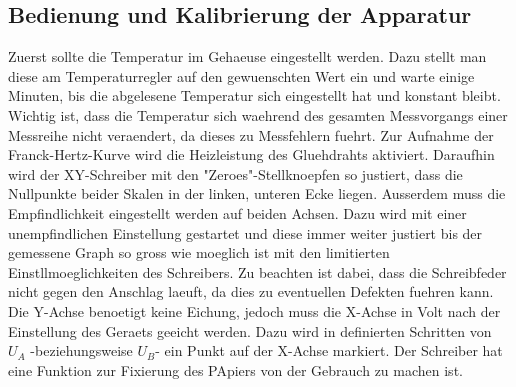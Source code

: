 \subsection{Bedienung und Kalibrierung der Apparatur}
Zuerst sollte die Temperatur im Gehaeuse eingestellt werden. Dazu stellt man diese am Temperaturregler auf den gewuenschten Wert ein und warte einige Minuten, bis die abgelesene Temperatur sich eingestellt hat und konstant bleibt. Wichtig ist, dass die Temperatur sich waehrend des gesamten Messvorgangs einer Messreihe nicht veraendert, da dieses zu Messfehlern fuehrt. Zur Aufnahme der Franck-Hertz-Kurve wird die Heizleistung des Gluehdrahts aktiviert. Daraufhin wird der XY-Schreiber mit den "Zeroes"-Stellknoepfen so justiert, dass die Nullpunkte beider Skalen in der linken, unteren Ecke liegen. Ausserdem muss die Empfindlichkeit eingestellt werden auf beiden Achsen. Dazu wird mit einer unempfindlichen Einstellung gestartet und diese immer weiter justiert bis der gemessene Graph so gross wie moeglich ist mit den limitierten Einstllmoeglichkeiten des Schreibers. Zu beachten ist dabei, dass die Schreibfeder nicht gegen den Anschlag laeuft, da dies zu eventuellen Defekten fuehren kann. Die Y-Achse benoetigt keine Eichung, jedoch muss die X-Achse in Volt nach der Einstellung des Geraets geeicht werden. Dazu wird in definierten Schritten von $U_A$ -beziehungsweise $U_B$- ein Punkt auf der X-Achse markiert. Der Schreiber hat eine Funktion zur Fixierung des PApiers von der Gebrauch zu machen ist.
